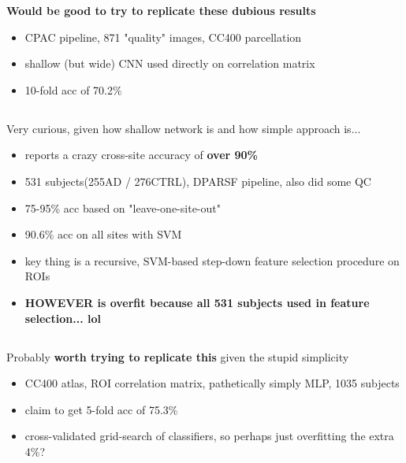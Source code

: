 \documentclass[10pt]{article}
\begin{document}
\textbf{Would be good to try to replicate these dubious results}

\begin{itemize}
  \item CPAC pipeline, 871 "quality" images, CC400 parcellation
  \item shallow (but wide) CNN used directly on correlation matrix
  \item 10-fold acc of 70.2\%
\end{itemize}

\subsection{\citet{wangFunctionalConnectivitybasedClassification2019}}

Very curious, given how shallow network is and how simple approach is...

\begin{itemize}
  \item reports a crazy cross-site accuracy of \textbf{over 90\%}
  \item  531 subjects(255AD / 276CTRL), DPARSF pipeline, also did some QC
  \item 75-95\% acc based on "leave-one-site-out"
  \item 90.6\% acc on all sites with SVM
  \item key thing is a recursive, SVM-based step-down feature selection procedure on ROIs
  \item \textbf{HOWEVER is overfit because all 531 subjects used in feature selection... lol}
\end{itemize}

\subsection{\citet{yangDeepNeuralNetwork2020}}

Probably \textbf{worth trying to replicate this} given the stupid simplicity

\begin{itemize}
  \item CC400 atlas, ROI correlation matrix, pathetically simply MLP, 1035 subjects
  \item claim to get 5-fold acc of 75.3\%
  \item cross-validated grid-search of classifiers, so perhaps just overfitting the extra 4\%?
\end{itemize}

\subsection{\citet{wangMAGEAutomaticDiagnosis2021}}
\end{document}
